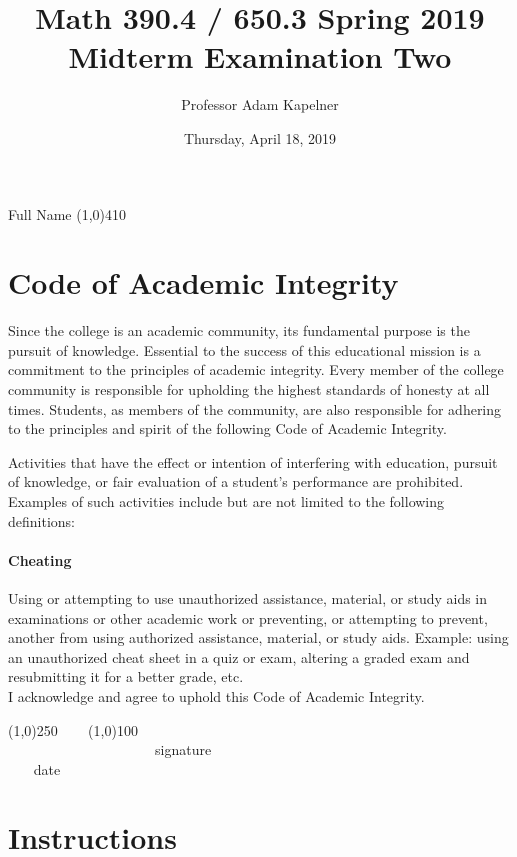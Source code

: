 \documentclass[12pt]{article}
\title{Math 390.4 / 650.3 Spring 2019 \\ Midterm Examination Two}
\author{Professor Adam Kapelner}
\date{Thursday, April 18, 2019}
\begin{document}
\maketitle

\noindent Full Name \line(1,0){410}

\thispagestyle{empty}

\section*{Code of Academic Integrity}

\footnotesize
Since the college is an academic community, its fundamental purpose is the pursuit of knowledge. Essential to the success of this educational mission is a commitment to the principles of academic integrity. Every member of the college community is responsible for upholding the highest standards of honesty at all times. Students, as members of the community, are also responsible for adhering to the principles and spirit of the following Code of Academic Integrity.

Activities that have the effect or intention of interfering with education, pursuit of knowledge, or fair evaluation of a student's performance are prohibited. Examples of such activities include but are not limited to the following definitions:

\paragraph{Cheating} Using or attempting to use unauthorized assistance, material, or study aids in examinations or other academic work or preventing, or attempting to prevent, another from using authorized assistance, material, or study aids. Example: using an unauthorized cheat sheet in a quiz or exam, altering a graded exam and resubmitting it for a better grade, etc.
\\

\noindent I acknowledge and agree to uphold this Code of Academic Integrity. \\

\begin{center}
\line(1,0){250} ~~~ \line(1,0){100}\\
~~~~~~~~~~~~~~~~~~~~~signature~~~~~~~~~~~~~~~~~~~~~~~~~~~~~~~~~~~~~~~~~~~~~ date
\end{center}

\normalsize

\section*{Instructions}
\end{document}
